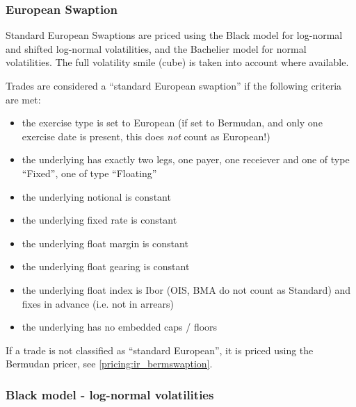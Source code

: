 \subsubsection{European Swaption}
\label{pricing:ir_euroswaption}

Standard European Swaptions are priced using the Black model for log-normal and shifted
log-normal volatilities, and the Bachelier model for normal volatilities. The 
full volatility smile (cube) is taken into account where available.

Trades are considered a ``standard European swaption'' if the following criteria are met:

\begin{itemize}
\item the exercise type is set to European (if set to Bermudan, and only one exercise date is present, this does {\em not} count as European!)
\item the underlying has exactly two legs, one payer, one receiever and one of type ``Fixed'', one of type ``Floating''
\item the underlying notional is constant
\item the underlying fixed rate is constant
\item the underlying float margin is constant
\item the underlying float gearing is constant
\item the underlying float index is Ibor (OIS, BMA do not count as Standard) and fixes in advance (i.e. not in arrears)
\item the underlying has no embedded caps / floors
\end{itemize}

If a trade is not classified as ``standard European'', it is priced using the Bermudan pricer, see
\ref{pricing:ir_bermswaption}.

\subsubsection*{Black model - log-normal volatilities}

